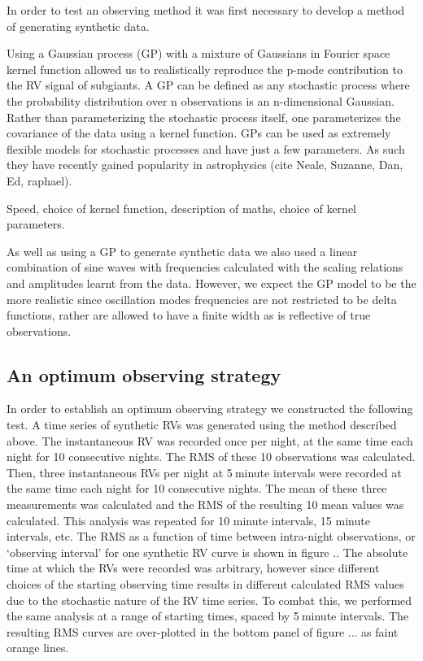 \documentclass[useAMS, usenatbib]{aastex}
\newcommand{\integer}{5}
\begin{document}

In order to test an observing method it was first necessary to develop a method
of generating synthetic data.

Using a Gaussian process (GP) with a mixture of Gaussians in Fourier space
kernel function allowed us to realistically reproduce the p-mode contribution
to the RV signal of subgiants.
A GP can be defined as any stochastic process
where the probability distribution over n observations is an n-dimensional
Gaussian.
Rather than parameterizing the stochastic process itself, one parameterizes the
covariance of the data using a kernel function.
GPs can be used as extremely flexible models for stochastic processes and have
just a few parameters.
As such they have recently gained popularity in astrophysics (cite Neale,
Suzanne, Dan, Ed, raphael).

Speed, choice of kernel function, description of maths, choice of kernel
parameters.

As well as using a GP to generate synthetic data we also used a linear
combination of sine waves with frequencies calculated with the
\citet{Kjeldsen1995} scaling relations and amplitudes learnt from the data.
However, we expect the GP model to be the more realistic since oscillation
modes frequencies are not restricted to be delta functions, rather are allowed
to have a finite width as is reflective of true observations.

\subsection{An optimum observing strategy}

In order to establish an optimum observing strategy we constructed the
following test.
A time series of synthetic RVs was generated using the method described above.
The instantaneous RV was recorded once per night, at the same time each night
for 10 consecutive nights.
The RMS of these 10 observations was calculated.
Then, three instantaneous RVs per night at \integer$~$minute intervals were
recorded at the same time each night for 10 consecutive nights.
The mean of these three measurements was calculated and the RMS of the
resulting 10 mean values was calculated.
This analysis was repeated for 10 minute intervals, 15 minute intervals, etc.
The RMS as a function of time between intra-night observations, or
`observing interval' for one synthetic RV curve is shown in figure ..
The absolute time at which the RVs were recorded was arbitrary, however since
different choices of the starting observing time results in different
calculated RMS values due to the stochastic nature of the RV time series.
To combat this, we performed the same analysis at a range of
starting times, spaced by \integer$~$minute intervals.
The resulting RMS curves are over-plotted in the bottom panel of figure ...
as faint orange lines.
\end{document}
